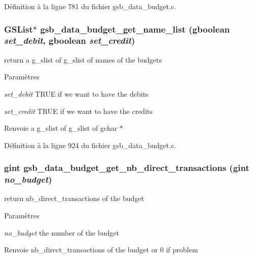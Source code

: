 Définition à la ligne 781 du fichier gsb\_\-data\_\-budget.c.

\subsubsection[{gsb\_\-data\_\-budget\_\-get\_\-name\_\-list}]{\setlength{\rightskip}{0pt plus 5cm}GSList$\ast$ gsb\_\-data\_\-budget\_\-get\_\-name\_\-list (gboolean {\em set\_\-debit}, \/  gboolean {\em set\_\-credit})}\label{gsb__data__budget_8h_a1478a23010fb605611356e0966dabca3}
return a g\_\-slist of g\_\-slist of names of the budgets


\begin{DoxyParams}{Paramètres}
\item[{\em set\_\-debit}]TRUE if we want to have the debits \item[{\em set\_\-credit}]TRUE if we want to have the credits\end{DoxyParams}
\begin{DoxyReturn}{Renvoie}
a g\_\-slist of g\_\-slist of gchar $\ast$ 
\end{DoxyReturn}


Définition à la ligne 924 du fichier gsb\_\-data\_\-budget.c.

\subsubsection[{gsb\_\-data\_\-budget\_\-get\_\-nb\_\-direct\_\-transactions}]{\setlength{\rightskip}{0pt plus 5cm}gint gsb\_\-data\_\-budget\_\-get\_\-nb\_\-direct\_\-transactions (gint {\em no\_\-budget})}\label{gsb__data__budget_8h_a1459ccca9cd3a215c837409216667d00}
return nb\_\-direct\_\-transactions of the budget


\begin{DoxyParams}{Paramètres}
\item[{\em no\_\-budget}]the number of the budget\end{DoxyParams}
\begin{DoxyReturn}{Renvoie}
nb\_\-direct\_\-transactions of the budget or 0 if problem 
\end{DoxyReturn}


